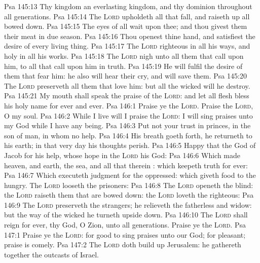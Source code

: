 \vs Psa 145:13 Thy kingdom  an everlasting kingdom, and thy dominion  throughout all generations.
\vs Psa 145:14 The \textsc{Lord} upholdeth all that fall, and raiseth up all  bowed down.
\vs Psa 145:15 The eyes of all wait upon thee; and thou givest them their meat in due season.
\vs Psa 145:16 Thou openest thine hand, and satisfiest the desire of every living thing.
\vs Psa 145:17 The \textsc{Lord}  righteous in all his ways, and holy in all his works.
\vs Psa 145:18 The \textsc{Lord}  nigh unto all them that call upon him, to all that call upon him in truth.
\vs Psa 145:19 He will fulfil the desire of them that fear him: he also will hear their cry, and will save them.
\vs Psa 145:20 The \textsc{Lord} preserveth all them that love him: but all the wicked will he destroy.
\vs Psa 145:21 My mouth shall speak the praise of the \textsc{Lord}: and let all flesh bless his holy name for ever and ever.
\vs Psa 146:1 Praise ye the \textsc{Lord}. Praise the \textsc{Lord}, O my soul.
\vs Psa 146:2 While I live will I praise the \textsc{Lord}: I will sing praises unto my God while I have any being.
\vs Psa 146:3 Put not your trust in princes,  in the son of man, in whom  no help.
\vs Psa 146:4 His breath goeth forth, he returneth to his earth; in that very day his thoughts perish.
\vs Psa 146:5 Happy  that  the God of Jacob for his help, whose hope  in the \textsc{Lord} his God:
\vs Psa 146:6 Which made heaven, and earth, the sea, and all that therein : which keepeth truth for ever:
\vs Psa 146:7 Which executeth judgment for the oppressed: which giveth food to the hungry. The \textsc{Lord} looseth the prisoners:
\vs Psa 146:8 The \textsc{Lord} openeth  the blind: the \textsc{Lord} raiseth them that are bowed down: the \textsc{Lord} loveth the righteous:
\vs Psa 146:9 The \textsc{Lord} preserveth the strangers; he relieveth the fatherless and widow: but the way of the wicked he turneth upside down.
\vs Psa 146:10 The \textsc{Lord} shall reign for ever,  thy God, O Zion, unto all generations. Praise ye the \textsc{Lord}.
\vs Psa 147:1 Praise ye the \textsc{Lord}: for  good to sing praises unto our God; for  pleasant;  praise is comely.
\vs Psa 147:2 The \textsc{Lord} doth build up Jerusalem: he gathereth together the outcasts of Israel.

